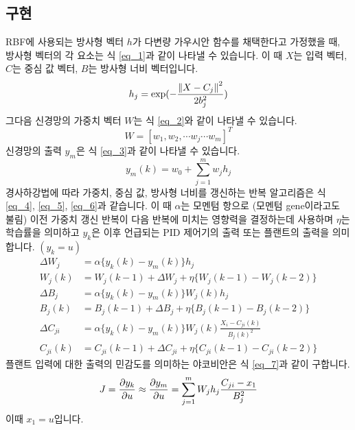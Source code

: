 \subsection{구현}
RBF에 사용되는 방사형 벡터 \(h\)가 다변량 가우시안 함수를 채택한다고 가정했을 때, 방사형 벡터의 각 요소는 식 \ref{eq_1}과 같이 나타낼 수 있습니다. \cite{1563016} 이 때  \(X\)는 입력 벡터, \(C\)는 중심 값 벡터, \(B\)는 방사형 너비 벡터입니다.
%
\begin{equation} \label{eq_1}
h_{j}=\exp(-{\left\Vert X-C_{j}\right\Vert^{2}\over 2b_{j}^{2}})
\end{equation}
%
그다음 신경망의 가중치 벡터 \(W\)는 식 \ref{eq_2}와 같이 나타낼 수 있습니다.
\begin{equation} \label{eq_2}
W=[w_{1},w_{2},\cdots w_{j}\cdots w_{m}]^{T} 
\end{equation}
%
신경망의 출력 \(y_m\)은 식 \ref{eq_3}과 같이 나타낼 수 있습니다.
%
\begin{equation} \label{eq_3}
y_{m}(k)=w_{0}+\sum\limits_{j=1}^{m}w_{j}h_{j} 
\end{equation}
%
경사하강법에 따라 가중치, 중심 값, 방사형 너비를 갱신하는 반복 알고리즘은 식 \ref{eq_4}, \ref{eq_5}, \ref{eq_6}과 같습니다. 이 때 \(\alpha\)는 모멘텀 항으로 (모멘텀 gene이라고도 불림) 이전 가중치 갱신 반복이 다음 반복에 미치는 영향력을 결정하는데 사용하며 \cite{Markopoulos2016-il} \(\eta\)는 학습률을 의미하고 \(y_{k}\)은 이후 언급되는 PID 제어기의 출력 또는 플랜트의 출력을 의미합니다. \((y_{k}=u)\)
%
\begin{align} 
\Delta W_{j} &=\alpha \{y_{k}(k)-y_{m}(k)\}h_{j} \\
\label{eq_4}
W_{j}(k) &=W_{j}(k-1)+\Delta W_{j}+\eta \{ W_{j}(k-1)-W_{j}(k-2) \} \\
\Delta B_{j} &=\alpha \{y_{k}(k)-y_{m}(k)\} W_{j}(k)h_{j} \\
\label{eq_5}
B_{j}(k) &= B_{j}(k-1)+\Delta B_{j} + \eta \{ B_{j}(k-1)-B_{j}(k-2) \} \\
\Delta C_{ji} &= \alpha \{ y_{k}(k)-y_{m}(k)\} W_{j}(k) \frac{X_{i}-C_{ji}(k)}{B_{j}(k)^2} \\
\label{eq_6}
C_{ji}(k) &= C_{ji}(k-1) + \Delta C_{ji} + \eta \{ C_{ji}(k-1)-C_{ji}(k-2) \}
\end{align} 
%
플랜트 입력에 대한 출력의 민감도를 의미하는 야코비안은 식 \ref{eq_7}과 같이 구합니다.
%
\begin{equation} \label{eq_7}
J = {\partial y_{k}\over \partial u}\approx{\partial y_{m}\over \partial u}
=\sum\limits_{j=1}^{m}W_{j}h_{j}{C_{ji}-x_{1}\over B_{j}^{2}}
\end{equation}
%
이때 \(x_{1}=u\)입니다.
%